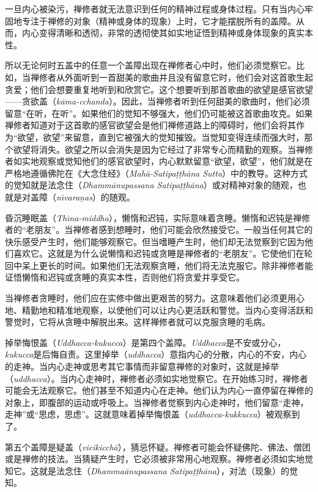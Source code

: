 一旦内心被染污，禅修者就无法意识到任何的精神过程或身体过程。只有当内心牢固地专注于禅修的对象（精神或身体的现象）上时，它才能摆脱所有的盖障。从而，内心变得清晰和透彻，非常的透彻使其如实地证悟到精神或身体现象的真实本性。

所以无论何时五盖中的任意一个盖障出现在禅修者心中时，他们必须觉察它。比如，当禅修者从外面听到一首甜美的歌曲并且没有留意它时，他们会对这首歌生起贪爱；他们会想要重复地听到和欣赏它。这个想要听到那首歌曲的欲望是感官欲望——贪欲盖（{\it k\=ama-\1cchanda}）。因此，当禅修者听到任何甜美的歌曲时，他们必须留意“在听，在听”。如果他们的觉知不够强大，他们仍可能被这首歌曲攻克。如果禅修者知道对于这首歌的感官欲望会是他们禅修道路上的障碍时，他们会将其作为“欲望，欲望”来留意，直到它被强大的觉知摧毁。当觉知变得连续而强大时，那个欲望将消失。欲望之所以会消失是因为它经过了非常专心而精勤的观察。当禅修者如实地观察或觉知他们的感官欲望时，内心默默留意“欲望，欲望”，他们就是在严格地遵循佛陀在《大念住经》（{\it Mah\=a-Satipa\d t\d th\=ana Sutta}）中的教导。这种方式的觉知就是法念住（{\it Dhamm\=anupassana Satipa\d t\d th\=ana}）或对精神对象的随观，也就是对盖障（{\it n\=\i vara\d nas}）的随观。

昏沉睡眠盖（{\it Th\=\i na-middha}），懒惰和迟钝，实际意味着贪睡。懒惰和迟钝是禅修者的“老朋友”。当禅修者感到想睡时，他们可能会欣然接受它。一般当任何其它的快乐感受产生时，他们能够观察它。但当嗜睡产生时，他们却无法觉察到它因为他们喜欢它。这就是为什么说懒惰和迟钝或贪睡是禅修者的“老朋友”。它使他们在轮回中呆上更长的时间。如果他们无法观察贪睡，他们将无法克服它。除非禅修者能证悟懒惰和迟钝或贪睡的真实本性，否则他们将贪爱并享受它。

当禅修者贪睡时，他们应在实修中做出更艰苦的努力。这意味着他们必须更用心地、精勤地和精准地观察，以使他们可以让内心更活跃和警觉。\1当内心变得活跃和警觉时，它将从贪睡中解脱出来。这样禅修者就可以克服贪睡的毛病。

掉举悔恨盖（{\it Uddhacca-kukucca}）是第四个盖障。{\it Uddhacca}是不安或分心，{\it kukucca}是后悔自责。这里掉举（{\it uddhacca}）意指内心的分散，内心的不安，内心的走神。当内心走神或思考其它事情而非留意禅修的对象时，这就是掉举（{\it uddhacca}）。当内心走神时，禅修者必须如实地觉察它。在开始练习时，禅修者可能会无法观察它。他们甚至不知道内心在走神。他们认为内心一直停留在禅修的对象上，即腹部的运动或呼吸上。当禅修者觉察到内心走神时，他们留意“走神，走神”或“思虑，思虑”。这就意味着掉举悔恨盖（{\it uddhacca-kukkucca}）被观察到了。

第五个盖障是疑盖（{\it vicikicch\=a}），猜忌怀疑。禅修者可能会怀疑佛陀、佛法、僧团或是禅修的技法。当猜疑产生时，它必须被非常用心地观察。禅修者必须如实地觉知它。这就是法念住（{\it Dhamma\=anupassana Satipa\d t\d th\=ana}），对法（现象）的觉知。

